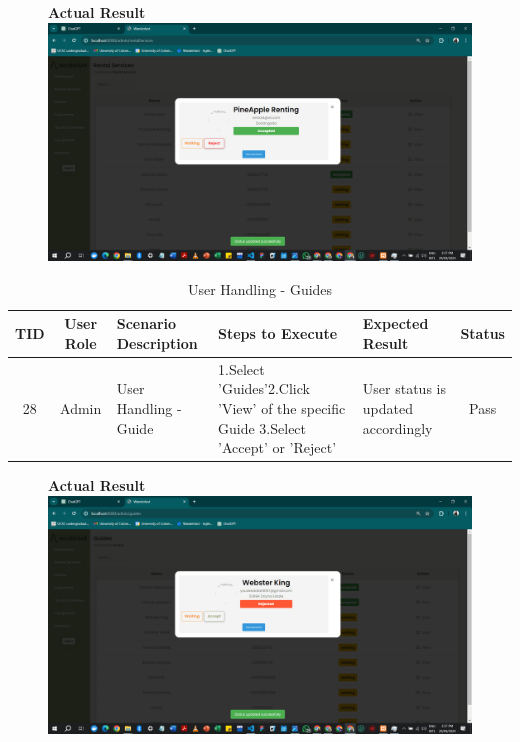 \begin{figure}[h!]
    \centering
    \textbf{Actual Result}
    \includegraphics[width=1\textwidth]{Images/Test Cases/27. Handling Rentals.png}
\end{figure}
\clearpage


\begin{table}[ht]
\centering
\begin{tabularx}{\textwidth}{|c|c|X|X|X|c|}
\hline
\textbf{TID} & \textbf{User Role} & \textbf{Scenario Description} & \textbf{Steps to Execute} & \textbf{Expected Result} & \textbf{Status} \\ \hline
28 & Admin & User Handling - Guide &  1.Select 'Guides'\newline 2.Click 'View' of the specific Guide \newline3.Select 'Accept' or 'Reject' & User status is updated accordingly & Pass \\ \hline
\end{tabularx}
\caption{User Handling - Guides}
\end{table}

\begin{figure}[h!]
    \centering
    \textbf{Actual Result}
    \includegraphics[width=1\textwidth]{Images/Test Cases/28. Handling Guides.png}
\end{figure}
\clearpage



